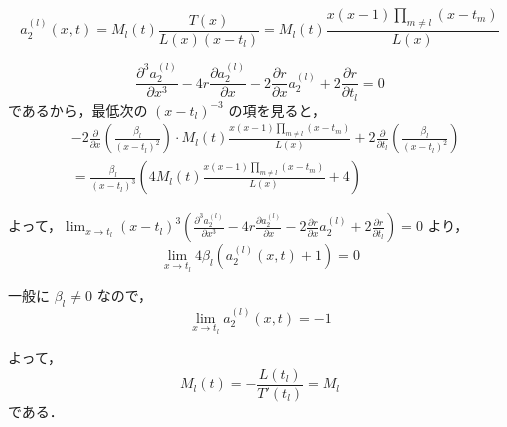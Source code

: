 \documentclass[paper=a4, fontsize=11pt]{jlreq} %
\theoremstyle{break}
\theoremstyle{qa}
\begin{document}
\begin{equation*}
    a_2^{(l)}(x,t) = M_l(t) \frac{T(x)}{L(x)(x-t_l)} = M_l(t) \frac{x(x-1)\prod_{m \neq l} (x-t_m)}{L(x)}
\end{equation*}

\begin{equation*}
    \frac{\partial^3 a_2^{(l)}}{\partial x^3} - 4r \frac{\partial a_2^{(l)}}{\partial x} - 2\frac{\partial r}{\partial x} a_2^{(l)} + 2\frac{\partial r}{\partial t_l} = 0
\end{equation*}
であるから，最低次の $(x-t_l)^{-3}$ の項を見ると，
\begin{align*}
    & -2 \frac{\partial}{\partial x} \left( \frac{\beta_l}{(x-t_l)^2} \right) \cdot M_l(t) \frac{x(x-1)\prod_{m \neq l} (x-t_m)}{L(x)} + 2 \frac{\partial}{\partial t_l} \left( \frac{\beta_l}{(x-t_l)^2} \right) \\
    &= \frac{\beta_l}{(x-t_l)^3} \left( 4 M_l(t) \frac{x(x-1)\prod_{m \neq l} (x-t_m)}{L(x)} + 4 \right)
\end{align*}

よって，$\displaystyle \lim_{x \to t_l} (x-t_l)^3 \left( \frac{\partial^3 a_2^{(l)}}{\partial x^3} - 4r \frac{\partial a_2^{(l)}}{\partial x} - 2\frac{\partial r}{\partial x} a_2^{(l)} + 2\frac{\partial r}{\partial t_l} \right) = 0$ より，
\begin{equation*}
    \lim_{x \to t_l} 4\beta_l \left( a_2^{(l)}(x,t) + 1 \right) = 0
\end{equation*}

一般に $\beta_l \neq 0$ なので，
\[
\lim_{x \to t_l} a_2^{(l)}(x,t) = -1
\]

よって，
\[
M_l(t) = - \frac{L(t_l)}{T'(t_l)} = M_l
\]
である．
\end{document}
